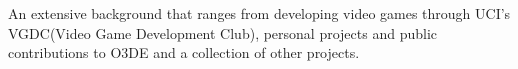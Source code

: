 

\begin{cvparagraph}



An extensive background that ranges from developing video games through UCI's VGDC(Video Game Development Club), personal projects and public contributions to O3DE and a collection of other projects.
\end{cvparagraph}
\vspace{-0.2cm}